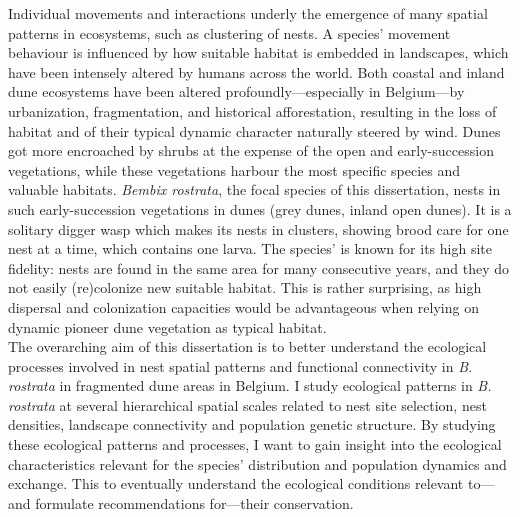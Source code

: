 \documentclass[10pt, twoside]{book} %
\begin{document}
Individual movements and interactions underly the emergence of many spatial patterns in ecosystems, such as clustering of nests. A species' movement behaviour is influenced by how suitable habitat is embedded in landscapes, which have been intensely altered by humans across the world. Both coastal and inland dune ecosystems have been altered profoundly---especially in Belgium---by urbanization, fragmentation, and historical afforestation, resulting in the loss of habitat and of their typical dynamic character naturally steered by wind. Dunes got more encroached by shrubs at the expense of the open and early-succession vegetations, while these vegetations harbour the most specific species and valuable habitats. \textit{Bembix rostrata}, the focal species of this dissertation, nests in such early-succession vegetations in dunes (grey dunes, inland open dunes). It is a solitary digger wasp which makes its nests in clusters, showing brood care for one nest at a time, which contains one larva. The species' is known for its high site fidelity: nests are found in the same area for many consecutive years, and they do not easily (re)colonize new suitable habitat. This is rather surprising, as high dispersal and colonization capacities would be advantageous when relying on dynamic pioneer dune vegetation as typical habitat.\\

The overarching aim of this dissertation is to better understand the ecological processes involved in nest spatial patterns and functional connectivity in \textit{B. rostrata} in fragmented dune areas in Belgium. I study ecological patterns in \textit{B. rostrata} at several hierarchical spatial scales related to nest site selection, nest densities, landscape connectivity and population genetic structure. By studying these ecological patterns and processes, I want to gain insight into the ecological characteristics relevant for the species' distribution and population dynamics and exchange. This to eventually understand the ecological conditions relevant to---and formulate recommendations for---their conservation.\\
\end{document}
